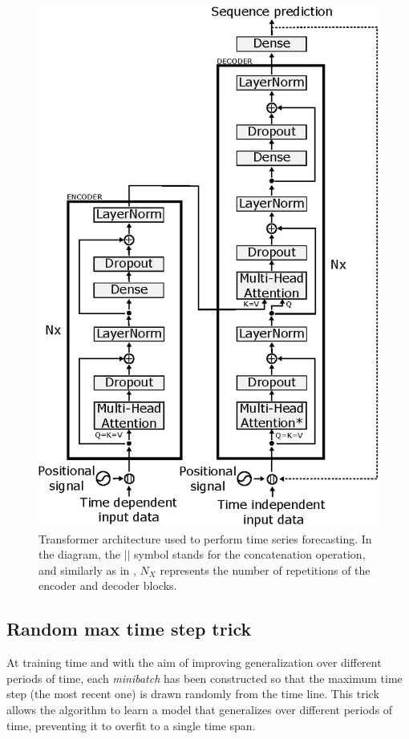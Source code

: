 \documentclass{elsarticle}
\begin{document}
    \begin{figure}[h!]
    	\centering
    	\includegraphics[width=0.7\linewidth]{img/transformer}
    	\caption{Transformer architecture used to perform time series forecasting. In the diagram, the $||$ symbol stands for the concatenation operation, and similarly as in \cite{vaswani2017}, $N_X$ represents the number of repetitions of the encoder and decoder blocks.}
    	\label{fig:transformer}
    \end{figure}
    
    \subsection{Random max time step trick} 
    At training time and with the aim of improving generalization over different periods of time, each \textit{minibatch} has been constructed so that the maximum time step (the most recent one)  is drawn randomly from the time line. This trick allows the algorithm to learn a model that generalizes over different periods of time, preventing it to overfit to a single time span.
    
\end{document}
